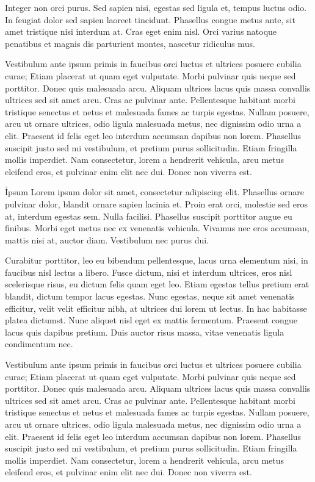 \documentclass{novel}
\begin{document}
Integer non orci purus. Sed sapien nisi, egestas sed ligula et, tempus luctus odio. In feugiat dolor sed sapien laoreet tincidunt. Phasellus congue metus ante, sit amet tristique nisi interdum at. Cras eget enim nisl. Orci varius natoque penatibus et magnis dis parturient montes, nascetur ridiculus mus.

Vestibulum ante ipsum primis in faucibus orci luctus et ultrices posuere cubilia curae; Etiam placerat ut quam eget vulputate. Morbi pulvinar quis neque sed porttitor. Donec quis malesuada arcu. Aliquam ultrices lacus quis massa convallis ultrices sed sit amet arcu. Cras ac pulvinar ante. Pellentesque habitant morbi tristique senectus et netus et malesuada fames ac turpis egestas. Nullam posuere, arcu ut ornare ultrices, odio ligula malesuada metus, nec dignissim odio urna a elit. Praesent id felis eget leo interdum accumsan dapibus non lorem. Phasellus suscipit justo sed mi vestibulum, et pretium purus sollicitudin. Etiam fringilla mollis imperdiet. Nam consectetur, lorem a hendrerit vehicula, arcu metus eleifend eros, et pulvinar enim elit nec dui. Donec non viverra est.

\h{Ipsum}
Lorem ipsum dolor sit amet, consectetur adipiscing elit. Phasellus ornare pulvinar dolor, blandit ornare sapien lacinia et. Proin erat orci, molestie sed eros at, interdum egestas sem. Nulla facilisi. Phasellus suscipit porttitor augue eu finibus. Morbi eget metus nec ex venenatis vehicula. Vivamus nec eros accumsan, mattis nisi at, auctor diam. Vestibulum nec purus dui.

Curabitur porttitor, leo eu bibendum pellentesque, lacus urna elementum nisi, in faucibus nisl lectus a libero. Fusce dictum, nisi et interdum ultrices, eros nisl scelerisque risus, eu dictum felis quam eget leo. Etiam egestas tellus pretium erat blandit, dictum tempor lacus egestas. Nunc egestas, neque sit amet venenatis efficitur, velit velit efficitur nibh, at ultrices dui lorem ut lectus. In hac habitasse platea dictumst. Nunc aliquet nisl eget ex mattis fermentum. Praesent congue lacus quis dapibus pretium. Duis auctor risus massa, vitae venenatis ligula condimentum nec.

Vestibulum ante ipsum primis in faucibus orci luctus et ultrices posuere cubilia curae; Etiam placerat ut quam eget vulputate. Morbi pulvinar quis neque sed porttitor. Donec quis malesuada arcu. Aliquam ultrices lacus quis massa convallis ultrices sed sit amet arcu. Cras ac pulvinar ante. Pellentesque habitant morbi tristique senectus et netus et malesuada fames ac turpis egestas. Nullam posuere, arcu ut ornare ultrices, odio ligula malesuada metus, nec dignissim odio urna a elit. Praesent id felis eget leo interdum accumsan dapibus non lorem. Phasellus suscipit justo sed mi vestibulum, et pretium purus sollicitudin. Etiam fringilla mollis imperdiet. Nam consectetur, lorem a hendrerit vehicula, arcu metus eleifend eros, et pulvinar enim elit nec dui. Donec non viverra est.
\end{document}
